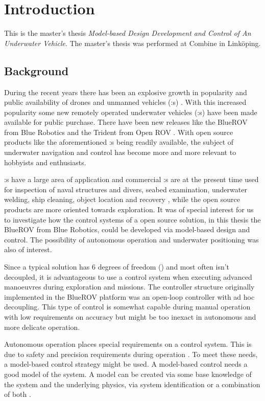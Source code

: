 \chapter{Introduction}\label{cha:intro}
This is the master's thesis \textit{Model-based Design Development and Control of An Underwater Vehicle}.
The master's thesis was performed at Combine in Linköping.

\section{Background}
During the recent years there has been an explosive growth in popularity and public availability of drones and unmanned vehicles (\abbrUV:s) \citep{popmechanics}. With this increased popularity some new remotely operated underwater vehicles (\abbrROV:s) have been made available for public purchase. There have been new releases like the BlueROV from Blue Robotics \citep{bluerobotics} and the Trident from Open ROV \citep{openrov}. With open source products like the aforementioned \abbrROV:s being readily available, the subject of underwater navigation and control has become more and more relevant to hobbyists and enthusiasts.

\abbrROV:s have a large area of application and commercial \abbrROV:s are at the present time used for inspection of naval structures and divers, seabed examination, underwater welding, ship cleaning, object location and recovery \citep{saab}, while the open source products are more oriented towards exploration. It was of special interest for us to investigate how the control systems of a open source \abbrROV solution, in this thesis the BlueROV from Blue Robotics, could be developed via model-based design and control. The possibility of autonomous operation and underwater positioning was also of interest.

Since a typical \abbrROV solution has 6 degrees of freedom (\abbrDOF) and most often isn't decoupled, it is advantageous to use a control system when executing advanced manoeuvres during exploration and missions. The controller structure originally implemented in the BlueROV platform was an open-loop controller with ad hoc decoupling. This type of control is somewhat capable during manual operation with low requirements on accuracy but might be too inexact in autonomous and more delicate operation. 

Autonomous operation places special requirements on a control system. This is due to safety and precision requirements during operation \citep[p.416-417]{safety}. To meet these needs, a model-based control strategy might be used. A model-based control needs a good model of the system. A model can be created via some base knowledge of the system and the underlying physics, via system identification or a combination of both \citet{modellbygge}. 

